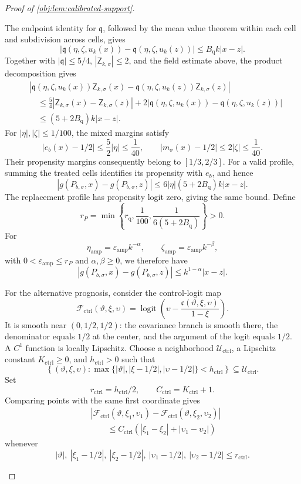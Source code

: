 \documentclass[11pt]{article}
\begin{document}
\begin{proof}[Proof of \cref{obj:lem:calibrated-support}]
\begin{enumerate}
The endpoint identity for \(\mathfrak q\), followed by the mean value theorem within each cell and subdivision across cells, gives
\[
|\mathfrak q(\eta,\zeta,u_k(x))
 -\mathfrak q(\eta,\zeta,u_k(z))|
\le B_{\mathrm q}k|x-z|.
\]
Together with \(|\mathfrak q|\le5/4\), \(|\mathsf Z_{k,\sigma}|\le2\), and the field estimate above, the product decomposition gives
\[
\begin{aligned}
&|\mathfrak q(\eta,\zeta,u_k(x))\mathsf Z_{k,\sigma}(x)
 -\mathfrak q(\eta,\zeta,u_k(z))\mathsf Z_{k,\sigma}(z)|\\
&\quad\le
\frac54|\mathsf Z_{k,\sigma}(x)-\mathsf Z_{k,\sigma}(z)|
+2|\mathfrak q(\eta,\zeta,u_k(x))
      -\mathfrak q(\eta,\zeta,u_k(z))|\\
&\quad\le(5+2B_{\mathrm q})k|x-z|.
\end{aligned}
\]
For \(|\eta|,|\zeta|\le1/100\), the mixed margins satisfy
\[
|e_b(x)-1/2|\le\frac52|\eta|\le\frac1{40},
\qquad
|m_\sigma(x)-1/2|\le2|\zeta|\le\frac1{40}.
\]
Their propensity margins consequently belong to \([1/3,2/3]\). For a valid profile, summing the treated cells identifies its propensity with \(e_b\), and hence
\[
|g(P_{b,\sigma},x)-g(P_{b,\sigma},z)|
\le6|\eta|(5+2B_{\mathrm q})k|x-z|.
\]
The replacement profile has propensity logit zero, giving the same bound. Define
\[
r_P=\min\left\{r_{\mathrm q},\frac1{100},
                  \frac1{6(5+2B_{\mathrm q})}\right\}>0.
\]
For
\[
\eta_{\mathrm{amp}}
=\varepsilon_{\mathrm{amp}}k^{-\alpha},
\qquad
\zeta_{\mathrm{amp}}
=\varepsilon_{\mathrm{amp}}k^{-\beta},
\]
with \(0<\varepsilon_{\mathrm{amp}}\le r_P\) and
\(\alpha,\beta\ge0\), we therefore have
\[
|g(P_{b,\sigma},x)-g(P_{b,\sigma},z)|
\le k^{1-\alpha}|x-z|.
\]

For the alternative prognosis, consider the control-logit map
\[
\mathcal F_{\mathrm{ctrl}}(\vartheta,\xi,\upsilon)
=\operatorname{logit}\!\left(
\upsilon-\frac{\mathfrak c(\vartheta,\xi,\upsilon)}{1-\xi}
\right).
\]
It is smooth near \((0,1/2,1/2)\): the covariance branch is smooth there, the denominator equals \(1/2\) at the center, and the argument of the logit equals \(1/2\). A \(C^1\) function is locally Lipschitz. Choose a neighborhood
\(\mathcal U_{\mathrm{ctrl}}\), a Lipschitz constant
\(K_{\mathrm{ctrl}}\ge0\), and \(h_{\mathrm{ctrl}}>0\) such that
\[
\left\{(\vartheta,\xi,\upsilon):
\max\{|\vartheta|,|\xi-1/2|,|\upsilon-1/2|\}
<h_{\mathrm{ctrl}}\right\}
\subseteq\mathcal U_{\mathrm{ctrl}}.
\]
Set
\[
r_{\mathrm{ctrl}}=h_{\mathrm{ctrl}}/2,
\qquad C_{\mathrm{ctrl}}=K_{\mathrm{ctrl}}+1.
\]
Comparing points with the same first coordinate gives
\[
\begin{aligned}
&|\mathcal F_{\mathrm{ctrl}}(\vartheta,\xi_1,\upsilon_1)
 -\mathcal F_{\mathrm{ctrl}}(\vartheta,\xi_2,\upsilon_2)|\\
&\qquad\le C_{\mathrm{ctrl}}
       (|\xi_1-\xi_2|+|\upsilon_1-\upsilon_2|)
\end{aligned}
\]
whenever
\[
|\vartheta|,\ |\xi_1-1/2|,\ |\xi_2-1/2|,
\ |\upsilon_1-1/2|,\ |\upsilon_2-1/2|
\le r_{\mathrm{ctrl}}.
\]


\end{enumerate}
\end{proof}
\end{document}

